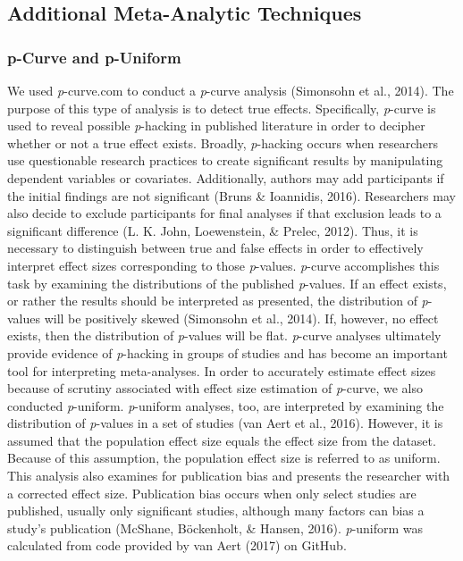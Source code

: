 \documentclass[man, mask]{apa6}
\newcounter{author}
\theoremstyle{definition}
\theoremstyle{definition}
\theoremstyle{definition}
\theoremstyle{remark}
\begin{document}
\subsection{Additional Meta-Analytic
Techniques}\label{additional-meta-analytic-techniques}

\subsubsection{p-Curve and p-Uniform}\label{p-curve-and-p-uniform}

We used \emph{p}-curve.com to conduct a \emph{p}-curve analysis
(Simonsohn et al., 2014). The purpose of this type of analysis is to
detect true effects. Specifically, \emph{p}-curve is used to reveal
possible \emph{p}-hacking in published literature in order to decipher
whether or not a true effect exists. Broadly, \emph{p}-hacking occurs
when researchers use questionable research practices to create
significant results by manipulating dependent variables or covariates.
Additionally, authors may add participants if the initial findings are
not significant (Bruns \& Ioannidis, 2016). Researchers may also decide
to exclude participants for final analyses if that exclusion leads to a
significant difference (L. K. John, Loewenstein, \& Prelec, 2012). Thus,
it is necessary to distinguish between true and false effects in order
to effectively interpret effect sizes corresponding to those
\emph{p}-values. \emph{p}-curve accomplishes this task by examining the
distributions of the published \emph{p}-values. If an effect exists, or
rather the results should be interpreted as presented, the distribution
of \emph{p}-values will be positively skewed (Simonsohn et al., 2014).
If, however, no effect exists, then the distribution of \emph{p}-values
will be flat. \emph{p}-curve analyses ultimately provide evidence of
\emph{p}-hacking in groups of studies and has become an important tool
for interpreting meta-analyses. In order to accurately estimate effect
sizes because of scrutiny associated with effect size estimation of
\emph{p}-curve, we also conducted \emph{p}-uniform. \emph{p}-uniform
analyses, too, are interpreted by examining the distribution of
\emph{p}-values in a set of studies (van Aert et al., 2016). However, it
is assumed that the population effect size equals the effect size from
the dataset. Because of this assumption, the population effect size is
referred to as uniform. This analysis also examines for publication bias
and presents the researcher with a corrected effect size. Publication
bias occurs when only select studies are published, usually only
significant studies, although many factors can bias a study's
publication (McShane, Böckenholt, \& Hansen, 2016). \emph{p}-uniform was
calculated from code provided by van Aert (2017) on GitHub.
\end{document}
